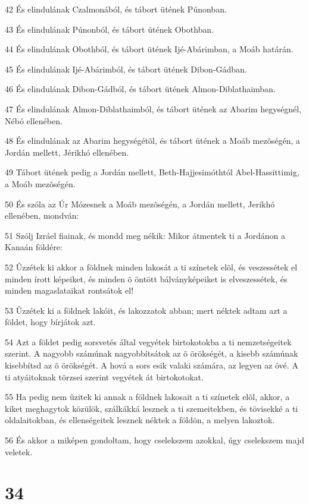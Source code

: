 \par 42 És elindulának Czalmonából, és tábort ütének Púnonban.
\par 43 És elindulának Púnonból, és tábort ütének Obothban.
\par 44 És elindulának Obothból, és tábort ütének Ijé-Abárimban, a Moáb határán.
\par 45 És elindulának Ijé-Abárimból, és tábort ütének Dibon-Gádban.
\par 46 És elindulának Dibon-Gádból, és tábort ütének Almon-Diblathaimban.
\par 47 És elindulának Almon-Diblathaimból, és tábort ütének az Abarim hegységnél, Nébó ellenében.
\par 48 És elindulának az Abarim hegységétõl, és tábort ütének a Moáb mezõségén, a Jordán mellett, Jérikhó ellenében.
\par 49 Tábort ütének pedig a Jordán mellett, Beth-Hajjesimóthtól Abel-Hassittimig, a Moáb mezõségén.
\par 50 És szóla az Úr Mózesnek a Moáb mezõségén, a Jordán mellett, Jerikhó ellenében, mondván:
\par 51 Szólj Izráel fiainak, és mondd meg nékik: Mikor átmentek ti a Jordánon a Kanaán földére:
\par 52 Ûzzétek ki akkor a földnek minden lakosát a ti színetek elõl, és veszessétek el minden írott képeiket, és minden õ  öntött bálványképeiket is elveszessétek, és minden magaslataikat rontsátok el!
\par 53 Ûzzétek ki a földnek lakóit, és lakozzatok abban; mert néktek adtam azt a földet, hogy bírjátok azt.
\par 54 Azt a földet pedig sorsvetés által vegyétek birtokotokba a ti nemzetségeitek szerint. A nagyobb számúnak nagyobbítsátok az õ örökségét, a kisebb számúnak kisebbítsd az õ örökségét. A hová a sors esik valaki számára, az legyen az övé. A ti atyáitoknak törzsei szerint vegyétek át birtokotokat.
\par 55 Ha pedig nem ûzitek ki annak a földnek lakosait a ti színetek elõl, akkor, a kiket meghagytok közülök, szálkákká lesznek a ti szemeitekben, és tövisekké a ti oldalaitokban, és ellenségeitek lesznek néktek a földön, a melyen lakoztok.
\par 56 És akkor a miképen gondoltam, hogy cselekszem azokkal, úgy cselekszem majd veletek.

\chapter{34}

